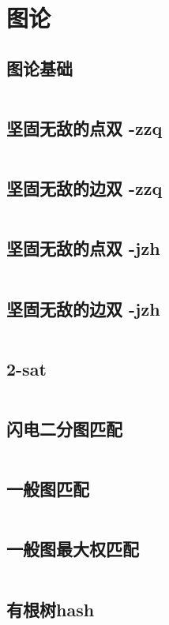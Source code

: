 \chapter{图论}
\section{图论基础}
\inputminted{cpp}{\source/graph-theory/basic.cpp}
\section{坚固无敌的点双 -zzq}
\inputminted{cpp}{\source/graph-theory/Biconnected-Point-Component -zzq.cpp}
\section{坚固无敌的边双 -zzq}
\inputminted{cpp}{\source/graph-theory/Biconnected-Edge-Component -zzq.cpp}
\section{坚固无敌的点双 -jzh}
\inputminted{cpp}{\source/graph-theory/biconnected-graph-vertex -jzh.cpp}
\section{坚固无敌的边双 -jzh}
\inputminted{cpp}{\source/graph-theory/biconnected-graph-edge -jzh.cpp}
\section{2-sat}
\inputminted{cpp}{\source/graph-theory/two-satisfiability.cpp}
\section{闪电二分图匹配}
\inputminted{cpp}{\source/graph-theory/Hopcroft-Karp.cpp}
\section{一般图匹配}
\inputminted{cpp}{\source/graph-theory/general-matching.cpp}
\section{一般图最大权匹配}
\inputminted{cpp}{\source/graph-theory/weighted_blossom.cpp}
\section{有根树hash}
\inputminted{cpp}{\source/graph-theory/rooted-tree-isomorphism.cpp}
